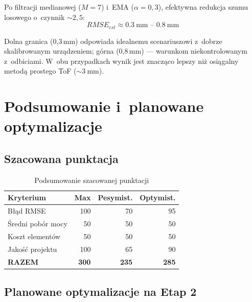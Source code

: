 \documentclass[a4paper,11pt]{article}
\begin{document}
Po filtracji medianowej ($M = 7$) i~EMA ($\alpha = 0{,}3$), efektywna
redukcja szumu losowego o~czynnik ${\sim}2{,}5$:
\begin{equation}
    \boxed{RMSE_{est} \approx \SI{0,3}{\milli\metre} \text{ -- } \SI{0,8}{\milli\metre}}
    \label{eq:rmse_final}
\end{equation}

Dolna granica (0,3\,mm) odpowiada idealnemu scenariuszowi z~dobrze
skalibrowanym urządzeniem; górna (0,8\,mm) --- warunkom niekontrolowanym
z~odbiciami. W~obu przypadkach wynik jest znacząco lepszy niż osiągalny
metodą prostego ToF (${\sim}\SI{3}{\milli\metre}$).


\section{Podsumowanie i~planowane optymalizacje}
\label{sec:podsumowanie}

\subsection{Szacowana punktacja}

\begin{table}[H]
    \centering
    \caption{Podsumowanie szacowanej punktacji}
    \label{tab:punktacja}
    \begin{tabular}{lrrr}
        \toprule
        \textbf{Kryterium} & \textbf{Max} & \textbf{Pesymist.} & \textbf{Optymist.} \\
        \midrule
        Błąd RMSE         & 100 & 70  & 95 \\
        Średni pobór mocy & 50  & 50  & 50 \\
        Koszt elementów   & 50  & 50  & 50 \\
        Jakość projektu   & 100 & 65  & 90 \\
        \midrule
        \textbf{RAZEM}    & \textbf{300} & \textbf{235} & \textbf{285} \\
        \bottomrule
    \end{tabular}
\end{table}

\subsection{Planowane optymalizacje na Etap 2}
\end{document}
